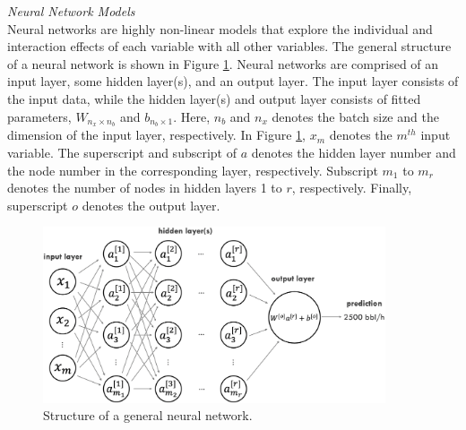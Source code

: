 %
%
\noindent
\textit{Neural Network Models} \\
Neural networks are highly non-linear models that explore the individual and interaction effects of each variable with all other variables. The general structure of a neural network is shown in Figure \ref{fig:08NN}.  Neural networks are comprised of an input layer, some hidden layer(s), and an output layer.  The input layer consists of the input data, while the hidden layer(s) and output layer consists of fitted parameters, $W_{n_x \times n_b}$ and $b_{n_b \times 1}$. Here, $n_b$ and $n_x$ denotes the batch size and the dimension of the input layer, respectively. In Figure \ref{fig:08NN}, $x_m$ denotes the $m^{th}$ input variable.  The superscript and subscript of $a$ denotes the hidden layer number and the node number in the corresponding layer, respectively.  Subscript $m_1$ to $m_r$ denotes the number of nodes in hidden layers 1 to $r$, respectively.  Finally, superscript $o$ denotes the output layer.
\begin{figure}[h]
    \centering
    \includegraphics[width=0.9\textwidth]{images/suncor/08NN.png}
    \caption{Structure of a general neural network.}
    \label{fig:08NN}
\end{figure}

